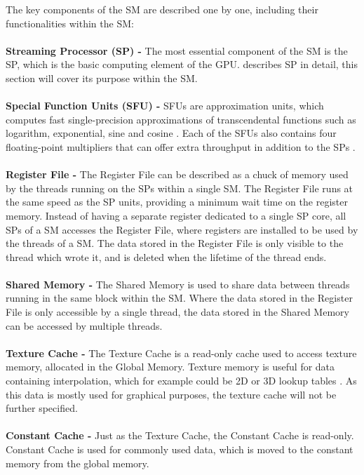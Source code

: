 The key components of the SM are described one by one, including their functionalities within the SM:
\\\\
\textbf{Streaming Processor (SP) -}  The most essential component of the SM is the SP, which is the basic computing element of the GPU.
 describes SP in detail, this section will cover its purpose within the SM.
\\\\	
\textbf{Special Function Units (SFU) -} SFUs are approximation units, which computes fast single-precision approximations of transcendental functions such as logarithm, exponential, sine and cosine \cite{Wilt2013}.
Each of the SFUs also contains four floating-point multipliers that can offer extra throughput in addition to the SPs \cite{Li2016}.
\\\\	
\textbf{Register File -} The Register File can be described as a chuck of memory used by the threads running on the SPs within a single SM. 
The Register File runs at the same speed as the SP units, providing a minimum wait time on the register memory. 
Instead of having a separate register dedicated to a single SP core, all SPs of a SM accesses the Register File, where registers are installed to be used by the threads of a SM.
The data stored in the Register File is only visible to the thread which wrote it, and is deleted when the lifetime of the thread ends.
\\\\	
\textbf{Shared Memory -} The Shared Memory is used to share data between threads running in the same block within the SM.
Where the data stored in the Register File is only accessible by a single thread, the data stored in the Shared Memory can be accessed by multiple threads.
\\\\		
\textbf{Texture Cache -} The Texture Cache is a read-only cache used to access texture memory, allocated in the Global Memory.
Texture memory is useful for data containing interpolation, which for example could be 2D or 3D lookup tables \cite{Cook2008}.
As this data is mostly used for graphical purposes, the texture cache will not be further specified.
\\\\	
\textbf{Constant Cache -} Just as the Texture Cache, the Constant Cache is read-only.
Constant Cache is used for commonly used data, which is moved to the constant memory from the global memory.
